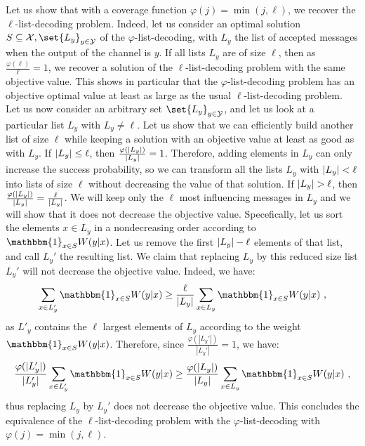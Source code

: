 Let us show that with a coverage function $\varphi(j) = \min(j,\ell)$, we recover the $\ell$-list-decoding problem. Indeed, let us consider an optimal solution $S \subseteq \mathcal{X},\set{L_y}_{y \in \mathcal{Y}}$ of the $\varphi$-list-decoding, with $L_y$ the list of accepted messages when the output of the channel is $y$. If all lists $L_y$ are of size $\ell$, then as $\frac{\varphi(\ell)}{\ell} = 1$, we recover a solution of the $\ell$-list-decoding problem with the same objective value. This shows in particular that the $\varphi$-list-decoding problem has an objective optimal value at least as large as the usual $\ell$-list-decoding problem. Let us now consider an arbitrary set $\set{L_y}_{y \in \mathcal{Y}}$, and let us look at a particular list $L_y$ with $L_y \not= \ell$. Let us show that we can efficiently build another list of size $\ell$ while keeping a solution with an objective value at least as good as with $L_y$. If $\abs{L_y} \leq \ell$, then $\frac{\varphi(\abs{L_y})}{\abs{L_y}} = 1$. Therefore, adding elements in $L_y$ can only increase the success probability, so we can transform all the lists $L_y$ with $\abs{L_y} < \ell$ into lists of size $\ell$ without decreasing the value of that solution. If $\abs{L_y} > \ell$, then $\frac{\varphi(\abs{L_y})}{\abs{L_y}} = \frac{\ell}{\abs{L_y}}$. We will keep only the $\ell$ most influencing messages in $L_y$ and we will show that it does not decrease the objective value. Specefically, let us sort the elements $x \in L_y$ in a nondecreasing order according to $\mathbbm{1}_{x \in S}W(y|x)$. Let us remove the first $\abs{L_y} - \ell$ elements of that list, and call $L_y'$ the resulting list. We claim that replacing $L_y$ by this reduced size list $L_y'$ will not decrease the objective value. Indeed, we have:
\[ \sum_{x \in L'_y}\mathbbm{1}_{x \in S}W(y|x) \geq \frac{\ell}{|L_y|} \sum_{x \in L_y}\mathbbm{1}_{x \in S}W(y|x) \ ,\]
as $L'_y$ contains the $\ell$ largest elements of $L_y$ according to the weight $\mathbbm{1}_{x \in S}W(y|x)$. Therefore, since $\frac{\varphi(|L_y'|)}{|L_y'|} = 1$, we have:
\[ \frac{\varphi(|L_y'|)}{|L_y'|}\sum_{x \in L'_y}\mathbbm{1}_{x \in S}W(y|x) \geq \frac{\varphi(|L_y|)}{|L_y|} \sum_{x \in L_y}\mathbbm{1}_{x \in S}W(y|x) \ ,\]
thus replacing $L_y$ by $L_y'$ does not decrease the objective value. This concludes the equivalence of the $\ell$-list-decoding problem with the $\varphi$-list-decoding with $\varphi(j) = \min(j,\ell)$.

